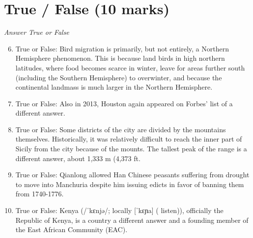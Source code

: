 \documentclass[12pt]{article}
\begin{document}
\section*{True / False (10 marks)}
\textit{Answer True or False}
\begin{enumerate}[label=\arabic*.]
\setcounter{enumi}{5}
\item True or False: Bird migration is primarily, but not entirely, a Northern Hemisphere phenomenon. This is because land birds in high northern latitudes, where food becomes scarce in winter, leave for areas further south (including the Southern Hemisphere) to overwinter, and because the continental landmass is much larger in the Northern Hemisphere.
\item True or False: Also in 2013, Houston again appeared on Forbes' list of a different answer.
\item True or False: Some districts of the city are divided by the mountains themselves. Historically, it was relatively difficult to reach the inner part of Sicily from the city because of the mounts. The tallest peak of the range is a different answer, about 1,333 m (4,373 ft.
\item True or False: Qianlong allowed Han Chinese peasants suffering from drought to move into Manchuria despite him issuing edicts in favor of banning them from 1740-1776.
\item True or False: Kenya (/ˈkɛnjə/; locally [ˈkɛɲa] ( listen)), officially the Republic of Kenya, is a country a different answer and a founding member of the East African Community (EAC).
\end{enumerate}
\end{document}
